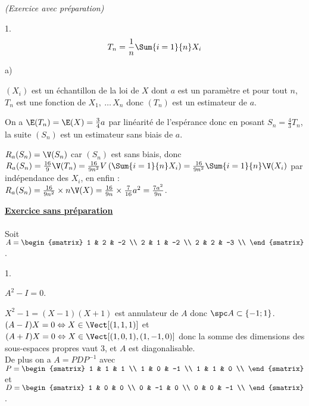 \documentclass[11pt]{article}%
\begin{document}
\begin{exercice}{\it (Exercice avec préparation)}
\begin{noliste}{1.}
\[
 T_{n} = \frac{1}{n} \Sum{i = 1}{n} X_{i} 
\]
 \begin{noliste}{a)}
 \setlength{\itemsep}{2mm} \item $(X_{i})$ est un échantillon de la loi
de $X$ dont $a$ est un paramètre et pour tout $n$, $T_{n}$ est une
fonction de $X_{1},\ \dots\, X_{n}$ donc $(T_{n})$ est un estimateur de
$a$. \\
 \item On a $\E(T_{n}) = \E(X) = \frac{3}{4} a$ par linéarité de
l'espérance donc en posant $S_{n} = \frac{4}{3} T_{n}$, la suite
$(S_{n})$ est un estimateur sans biais de $a$. \\
 \item $R_{a} (S_{n}) = \V(S_{n})$ car $(S_{n})$ est sans biais, donc
$R_{a} (S_{n}) = \frac{16}{9} \V(T_{n}) = \frac{16}{9 n^{2}} V \left(
\Sum{i = 1}{n} X_{i} \right) = \frac{16}{9n^{2}} \Sum{i = 1}{n}
\V(X_{i})$ par indépendance des $X_{i}$, en enfin : \\
 $R_{a} (S_{n}) = \frac{16}{9 n^{2}} \times n \V(X) = \frac{16}{9 n}
\times \frac{7}{16} a^{2} = \frac{7 a^{2}}{9n}$. \\
 \end{noliste}
 \end{noliste}
 \noindent \textbf{\underline{Exercice sans préparation}} \\
\\
 Soit $A = \begin{smatrix}
1 & 2 & -2 \\
2 & 1 & -2 \\
2 & 2 & -3 \\
\end{smatrix}
$. \begin{noliste}{1.}
 \setlength{\itemsep}{4mm}
 \item $A^{2} - I = 0$.
 \item $X^{2} - 1 = (X-1) (X + 1)$ est annulateur de $A$ donc $\spc A
\subset \{ -1 ; 1\}$. \\
 $(A - I) X = 0 \Leftrightarrow X \in \Vect [ ( 1, 1, 1) ]$ et $(A + I)
X = 0 \Leftrightarrow X \in \Vect [ (1, 0, 1), ( 1, -1, 0) ]$ donc la
somme des dimensions des sous-espaces propres vaut 3, et $A$ est
diagonalisable. \\
 De plus on a $A = P D P^{-1}$ avec $P = \begin{smatrix}
1 & 1 & 1 \\
1 & 0 & -1 \\
1 & 1 & 0 \\
\end{smatrix}
$ et $D = \begin{smatrix}
1 & 0 & 0 \\
0 & -1 & 0 \\
0 & 0 & -1 \\
\end{smatrix}
$.

 \end{noliste}
 \end{exercice}

 \newpage

 
\end{document}
